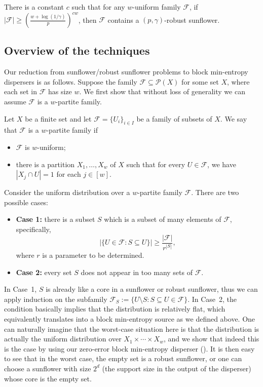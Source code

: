 \documentclass{toc}
\newcommand{\calF}{\mathcal{F}} %
\begin{document}
\begin{corollary} \label{thm:quasi}
There is a constant $c$
such that for any $w$-uniform family $\calF$, 
if $|\calF|\geq \left(\frac{w+\log(1/\gamma)}{p}\right)^{cw}$,
then $\calF$ contains a $(p, \gamma)$-robust sunflower.
\end{corollary}

\subsection{Overview of the techniques} Our reduction from
sunflower/robust sunflower problems to block min-entropy dispersers
is as follows. Suppose
the family $\calF\subseteq\mathcal{P}(X)$ for some set $X$,
where each set in $\calF$ has size $w$. We first show that
without loss of generality we can assume $\calF$
%
is a $w$-partite family.  %

%
\begin{definition}
\label{def:normal}
Let $X$ be a finite set and let $\calF= \{U_{i}\}_{i\in I}$
be a family of subsets of $X.$   We say that
$\calF$ is %
a $w$-partite family if  %
\begin{itemize}
\item %
  $\calF$ is $w$-uniform;
\item %
there is a  %
%
partition $X_{1}, \ldots, X_{w}$ of $X$ such that for every
$U \in\calF$, we have $|X_{j}\cap U|=1$ for each $j\in[w]$.
\end{itemize}
\end{definition}

\noindent Consider the uniform distribution over
%
%
%
%
a $w$-partite family $\calF$.  %
There are two possible cases:
\begin{itemize}
\item \textbf{Case 1:} there is a subset $S$ which
%
is a subset of %
many
%
elements  %
of $\calF$,
%
%
specifically,  %
$$\big|\{U\in\calF : S\subseteq U\}\big| \geq 
%
 \frac{\big|\calF\big|}{r^{|S|}},$$
where $r$ is a parameter to be determined. %

\item \textbf{Case 2:} every set $S$ does not appear in too many sets of $\calF$.
\end{itemize}

In Case~1, $S$ is already like a core in a sunflower or robust sunflower, thus we can apply induction on the %
subfamily  %
$\calF_{S}:=\{U\setminus S: S\subseteq U\in \calF\}$.
In Case~2, the condition basically implies that the distribution is relatively flat, which equivalently translates into a block min-entropy
source as we defined above. One can naturally imagine that the worst-case situation here is that the distribution is actually the uniform
distribution over $X_{1} \times \cdots \times X_{w}$, and we show that indeed this is the case by using our zero-error block min-entropy disperser ().
It is then easy to see that in the worst case, the empty set is a robust sunflower, or one can choose a sunflower with size $2^{d}$ (the support size
in the output of the disperser) whose core is the empty set.
\end{document}
